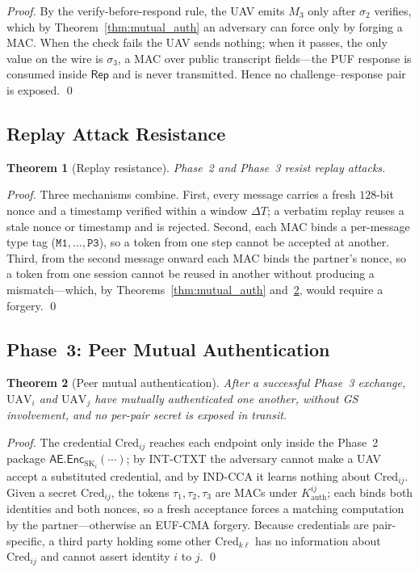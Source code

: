 \documentclass[11pt,a4paper]{article}
\newtheorem{theorem}{Theorem}
\begin{document}
\begin{proof}
By the verify-before-respond rule, the UAV emits $M_3$ only after $\sigma_2$
verifies, which by Theorem~\ref{thm:mutual_auth} an adversary can force only by
forging a MAC. When the check fails the UAV sends nothing; when it passes, the
only value on the wire is $\sigma_3$, a MAC over public transcript fields---the
PUF response is consumed inside $\mathsf{Rep}$ and is never transmitted. Hence
no challenge--response pair is exposed. \qed
\end{proof}

\subsection{Replay Attack Resistance}

\begin{theorem}[Replay resistance]
\label{thm:replay}
Phase~2 and Phase~3 resist replay attacks.
\end{theorem}

\begin{proof}
Three mechanisms combine. First, every message carries a fresh $128$-bit nonce
and a timestamp verified within a window $\Delta T$; a verbatim replay reuses a
stale nonce or timestamp and is rejected. Second, each MAC binds a per-message
type tag ($\texttt{M1},\dots,\texttt{P3}$), so a token from one step cannot be
accepted at another. Third, from the second message onward each MAC binds the
partner's nonce, so a token from one session cannot be reused in another without
producing a mismatch---which, by Theorems~\ref{thm:mutual_auth}
and~\ref{thm:peer_auth}, would require a forgery. \qed
\end{proof}

\subsection{Phase~3: Peer Mutual Authentication}

\begin{theorem}[Peer mutual authentication]
\label{thm:peer_auth}
After a successful Phase~3 exchange, $\text{UAV}_i$ and $\text{UAV}_j$ have
mutually authenticated one another, without GS involvement, and no per-pair
secret is exposed in transit.
\end{theorem}

\begin{proof}
The credential $\text{Cred}_{ij}$ reaches each endpoint only inside the Phase~2
package $\mathsf{AE}.\mathsf{Enc}_{\text{SK}_i}(\cdots)$; by INT-CTXT the
adversary cannot make a UAV accept a substituted credential, and by IND-CCA it
learns nothing about $\text{Cred}_{ij}$. Given a secret $\text{Cred}_{ij}$, the
tokens $\tau_1,\tau_2,\tau_3$ are MACs under
$K^{ij}_{\text{auth}}$; each binds both identities and both nonces, so a fresh
acceptance forces a matching computation by the partner---otherwise an EUF-CMA
forgery. Because credentials are pair-specific, a third party holding some other
$\text{Cred}_{k\ell}$ has no information about $\text{Cred}_{ij}$ and cannot
assert identity $i$ to $j$. \qed
\end{proof}
\end{document}
